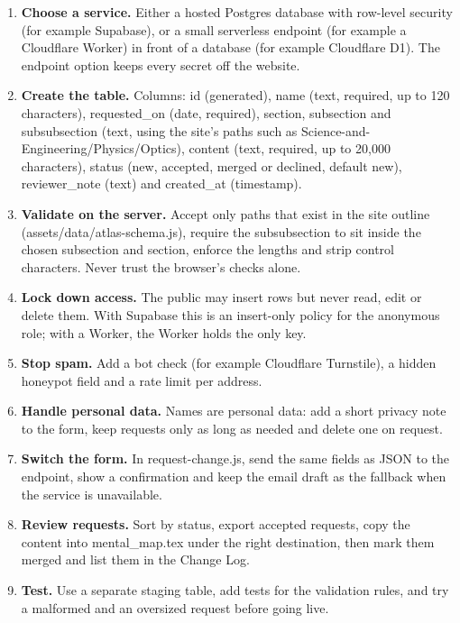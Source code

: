 \documentclass[11pt]{article}
\begin{document}
\begin{enumerate}
\item \textbf{Choose a service.} Either a hosted Postgres database with row-level security (for example Supabase), or a small serverless endpoint (for example a Cloudflare Worker) in front of a database (for example Cloudflare D1). The endpoint option keeps every secret off the website.
\item \textbf{Create the table.} Columns: id (generated), name (text, required, up to 120 characters), requested\_on (date, required), section, subsection and subsubsection (text, using the site's paths such as Science-and-Engineering/Physics/Optics), content (text, required, up to 20,000 characters), status (new, accepted, merged or declined, default new), reviewer\_note (text) and created\_at (timestamp).
\item \textbf{Validate on the server.} Accept only paths that exist in the site outline (assets/data/atlas-schema.js), require the subsubsection to sit inside the chosen subsection and section, enforce the lengths and strip control characters. Never trust the browser's checks alone.
\item \textbf{Lock down access.} The public may insert rows but never read, edit or delete them. With Supabase this is an insert-only policy for the anonymous role; with a Worker, the Worker holds the only key.
\item \textbf{Stop spam.} Add a bot check (for example Cloudflare Turnstile), a hidden honeypot field and a rate limit per address.
\item \textbf{Handle personal data.} Names are personal data: add a short privacy note to the form, keep requests only as long as needed and delete one on request.
\item \textbf{Switch the form.} In request-change.js, send the same fields as JSON to the endpoint, show a confirmation and keep the email draft as the fallback when the service is unavailable.
\item \textbf{Review requests.} Sort by status, export accepted requests, copy the content into mental\_map.tex under the right destination, then mark them merged and list them in the Change Log.
\item \textbf{Test.} Use a separate staging table, add tests for the validation rules, and try a malformed and an oversized request before going live.
\end{enumerate}
\end{document}
